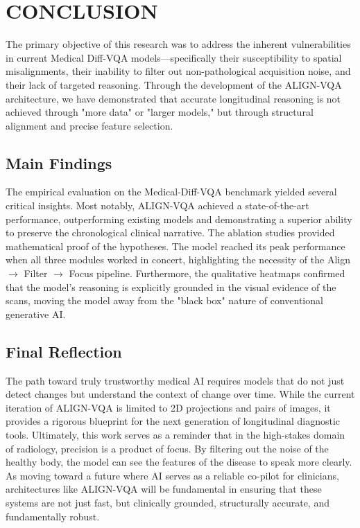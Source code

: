 \setlength{\footskip}{8mm}

\chapter{CONCLUSION}

The primary objective of this research was to address the inherent vulnerabilities in current Medical Diff-VQA models—specifically their susceptibility to spatial misalignments, their inability to filter out non-pathological acquisition noise, and their lack of targeted reasoning. Through the development of the ALIGN-VQA architecture, we have demonstrated that accurate longitudinal reasoning is not achieved through "more data" or "larger models," but through structural alignment and precise feature selection.

\section{Main Findings}
The empirical evaluation on the Medical-Diff-VQA benchmark yielded several critical insights. Most notably, ALIGN-VQA achieved a state-of-the-art performance, outperforming existing models and demonstrating a superior ability to preserve the chronological clinical narrative. The ablation studies provided mathematical proof of the hypotheses. The model reached its peak performance when all three modules worked in concert, highlighting the necessity of the Align $\rightarrow$ Filter $\rightarrow$ Focus pipeline. Furthermore, the qualitative heatmaps confirmed that the model’s reasoning is explicitly grounded in the visual evidence of the scans, moving the model away from the "black box" nature of conventional generative AI.

\section{Final Reflection}
The path toward truly trustworthy medical AI requires models that do not just detect changes but understand the context of change over time. While the current iteration of ALIGN-VQA is limited to 2D projections and pairs of images, it provides a rigorous blueprint for the next generation of longitudinal diagnostic tools.
Ultimately, this work serves as a reminder that in the high-stakes domain of radiology, precision is a product of focus. By filtering out the noise of the healthy body, the model can see the features of the disease to speak more clearly. As moving toward a future where AI serves as a reliable co-pilot for clinicians, architectures like ALIGN-VQA will be fundamental in ensuring that these systems are not just fast, but clinically grounded, structurally accurate, and fundamentally robust.